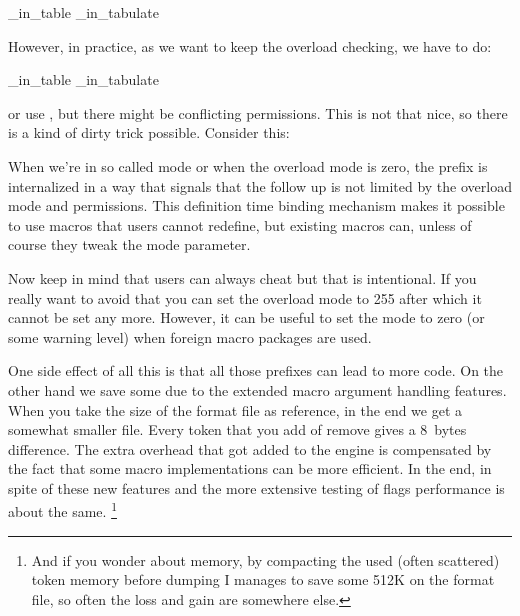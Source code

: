 \starttyping[option=TEX]
\frozen\protected{}
\frozen\protected{}
\overloaded\let\NC\NC_in_table
\overloaded\let\NC\NC_in_tabulate
\stoptyping

However, in practice, as we want to keep the overload checking, we have to do:

\starttyping[option=TEX]
\frozen\protected{}
\frozen\protected{}
\overloaded\frozen\let\NC\NC_in_table
\overloaded\frozen\let\NC\NC_in_tabulate
\stoptyping

or use \type {\aliased}, but there might be conflicting permissions. This is not
that nice, so there is a kind of dirty trick possible. Consider this:

\starttyping[option=TEX]
\frozen\protected{}
\frozen\protected{}
\def\setNCintable   {\enforced\let\frozen\let\NC\NC_in_table}
\def\setNCintabulate{\enforced\let\frozen\let\NC\NC_in_tabulate}
\stoptyping

When we're in so called  mode or when the overload mode is zero,
the \type {\enforced} prefix is internalized in a way that signals that the
follow up is not limited by the overload mode and permissions. This definition
time binding mechanism makes it possible to use  macros that
users cannot redefine, but existing macros can, unless of course they tweak the
mode parameter.

Now keep in mind that users can always cheat but that is intentional. If you
really want to avoid that you can set the overload mode to 255 after which it
cannot be set any more. However, it can be useful to set the mode to zero (or
some warning level) when foreign macro packages are used.

\stopsection

\startsection[title=Complications]

One side effect of all this is that all those prefixes can lead to more code. On
the other hand we save some due to the extended macro argument handling features.
When you take the size of the format file as reference, in the end we get a
somewhat smaller file. Every token that you add of remove gives a 8~bytes
difference. The extra overhead that got added to the engine is compensated by the
fact that some macro implementations can be more efficient. In the end, in spite
of these new features and the more extensive testing of flags performance is
about the same. \footnote {And if you wonder about memory, by compacting the used
(often scattered) token memory before dumping I manages to save some 512K on the
format file, so often the loss and gain are somewhere else.}

